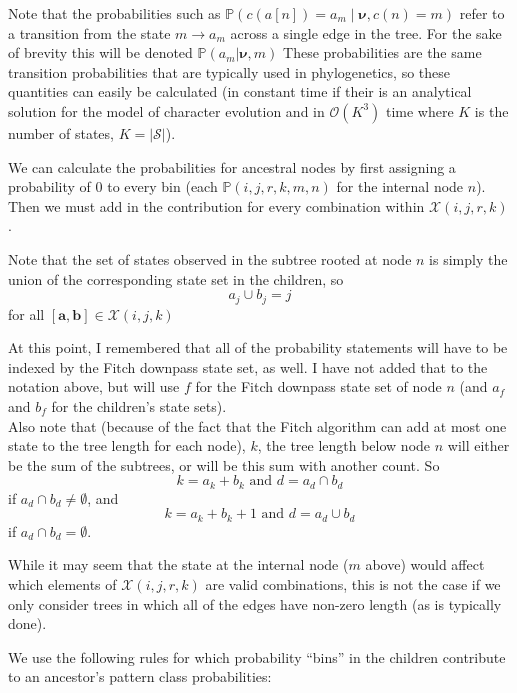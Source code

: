 \documentclass[11pt]{article}
\newcommand{\allStates}{\ensuremath{\mathcal S}\xspace}
\newcommand{\comboSet}{\ensuremath{\mathcal X}\xspace}
\newcommand{\edgeLengths}{\ensuremath{\bm \nu}\xspace}
\newcommand{\patProbSym}{\ensuremath{\mathbb P}\xspace}
\renewcommand{\Pr}{\patProbSym}
\newcommand{\patProb}[6]{\ensuremath{\patProbSym\left(#1,#2,#3,#4,#5,#6\right)}\xspace}
\newcommand{\stateOf}[1]{\ensuremath{c\left(#1\right)}\xspace}
\newcommand{\leftChild}[1]{\ensuremath{a\left[#1\right]}\xspace} %
\newcommand{\order}{{\mathcal{O}}}
\newcommand{\mthNote}[1]{{\color{red}#1}\\}
\begin{document}
Note that the probabilities such as $\Pr(\stateOf{\leftChild{n}}=a_m \mid \edgeLengths,\stateOf{n}=m)$ refer to a transition from the state $m\rightarrow a_m$ across a single edge in the tree. For the sake of brevity this will be denoted $\Pr(a_m|\edgeLengths, m)$
These probabilities are the same transition probabilities that are typically used in phylogenetics, so these quantities can easily be calculated (in constant time if their is an analytical solution for the model of character evolution and in $\order(K^3)$ time where $K$ is the number of states, $K=|\allStates|$).

We can calculate the probabilities for ancestral nodes by first assigning a probability of 0 to every bin (each \patProb{i}{j}{r}{k}{m}{n} for the internal node $n$).
Then we must add in the contribution for every combination within $\comboSet(i, j, r, k)$.

Note that the set of states observed in the subtree rooted at node $n$ is simply the union of the corresponding state set in the children, so
$$	a_j \cup b_j = j $$
for all $[{\bm a}, {\bm b}]\in\comboSet(i, j, k)$


\mthNote{At this point, I remembered that all of the probability statements will have to be indexed by the Fitch downpass state set, as well.  I have not added that to the notation above, but will use $f$ for the Fitch downpass state set of node $n$ (and $a_f$ and $b_f$ for the children's state sets).}
Also note that (because of the fact that the Fitch algorithm can add at most one state to the tree length for each node), $k$, the tree length below node $n$ will either be the sum of the subtrees, or will be this sum with another count.
So
 $$k = a_k + b_k\mbox{ and } d = a_d \cap b_d$$
 if $a_d \cap b_d \neq \emptyset$, and
  $$k = a_k + b_k + 1\mbox{ and } d = a_d \cup b_d$$
 if $a_d \cap b_d = \emptyset$.

While it may seem that the state at the internal node ($m$ above) would affect which elements of $\comboSet(i, j, r, k)$ are valid combinations, this is not the case if we only consider trees in which all of the edges have non-zero length (as is typically done).



We use the following rules for which probability ``bins'' in the children contribute to an ancestor's pattern class probabilities:
\end{document}

